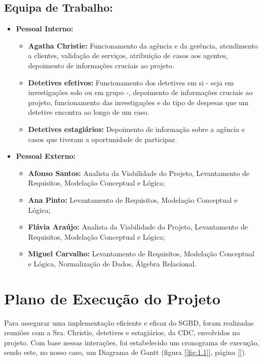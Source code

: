 \documentclass[a4paper,12pt]{scrreprt}
\begin{document}
        \clearpage
        
        \subsection{Equipa de Trabalho:}
            \begin{itemize}
                \item \textbf{Pessoal Interno:}
                \begin{itemize}
                    \item \textbf{Agatha Christie:} Funcionamento da agência e da gerência, atendimento a clientes,
                    validação de serviços, atribuição de casos aos agentes, depoimento de informações
                    cruciais ao projeto.
                    \item\textbf{Detetives efetivos:} Funcionamento dos detetives em si - seja em investigações solo ou em grupo -, depoimento de informações cruciais ao projeto, funcionamento das investigações e do tipo de despesas que um detetive encontra ao longo de um caso. 
                    \item\textbf{Detetives estagiários:} Depoimento de informação sobre a agência e casos que tiveram a oportunidade de participar.
                \end{itemize}
            \item \textbf{Pessoal Externo:}
                \begin{itemize}
                    \item \textbf{Afonso Santos:} Analista da Viabilidade do Projeto, Levantamento de Requisitos, Modelação Conceptual e Lógica;
                    \item \textbf{Ana Pinto:} Levantamento de Requisitos, Modelação Conceptual e Lógica;
                    \item \textbf{Flávia Araújo:} Analista da Viabilidade do Projeto, Levantamento de Requisitos, Modelação Conceptual e Lógica;
                    \item \textbf{Miguel Carvalho:} Levantamento de Requisitos, Modelação Conceptual e Lógica, Normalização de Dados, Álgebra Relacional. 
                \end{itemize}
            \end{itemize}

    \clearpage

    \section{Plano de Execução do Projeto}
        Para assegurar uma implementação eficiente e eficaz do SGBD, foram realizadas reuniões com a Sra$.$ Christie, detetives e estagiários, da CDC, envolvidos no projeto. Com base nessas interações, foi estabelecido um cronograma de execução, sendo este, no nosso caso, um Diagrama de Gantt (figura [\ref{fig:1.1}], página [\pageref{fig:1.1}]).
\end{document}
